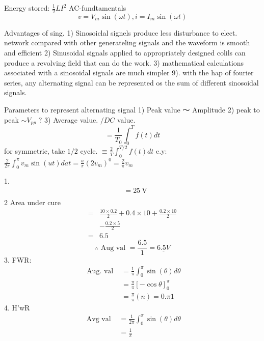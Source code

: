 \documentclass[12pt, a4paper]{article}
\begin{document}
	Energy stored: $\frac{1}{2} L I^2$
	AC-fundtamentals
	$$
		v=V_m \sin (\omega t), i=I_m \sin (\omega t)
	$$

	Advantages of sing.
	1) Sinosoiclal signels produce less disturbance to elect. network compared with other generateling signals and the waveform is smooth and efficient
	2) Sinusoidal signals applied to appropriately designed colils can produce a revolving field that can do the work.
	3) mathematical calculations associated with a sinosoidal signals are much simpler
	9). with the hap of fourier series, any alternating signal can be represented os the sum of different sinosoidal signals.

	Parameters to represent alternating signal
	1) Peak value 〜 Amplitude
	2) peak to peak $\sim V_{p p}$ ?
	3) Average value. $/ D C$ value.
	$$
		=\frac{1}{T_0} \int_0^T f(t) d t
	$$
	for symmetric, take $1 / 2$ cycle. $\equiv \frac{2}{T} \int_0^{T / 2} f(t) d t$
	e.y: $\frac{2}{2 \pi} \int_0^\pi v_m \sin (u t) d a t=\frac{a}{\pi}\left(2 v_m\right)^0=\frac{2}{\pi} v_m$


	1.
	$$
		\begin{aligned}
			 & =25 \mathrm{~V} \\
			 &
		\end{aligned}
	$$
	2 Area under cure
	$$
		\begin{aligned}
			= & \frac{10 \times 0.2}{2}+0.4 \times 10+\frac{0.2 \times 10}{2} \\
			  & -\frac{0.2 \times 5}{2}                                       \\
			= & 6.5
		\end{aligned}
	$$
	$$
		\therefore \text { Aug val }=\frac{6.5}{1}=\underline{6.5 V}
	$$
	3. FWR:
	$$
		\begin{aligned}
			\text { Aug. val } & =\frac{1}{\pi} \int_0^\pi \sin (\theta) d \theta \\
			                   & =\frac{\pi}{\pi}[-\cos \theta]_0^\pi             \\
			                   & =\frac{\pi}{\pi}(n)=0 . \pi 1
		\end{aligned}
	$$
	4. H'wR
	$$
		\begin{aligned}
			\text { Avg val } & =\frac{1}{2 \pi} \int_0^\pi \sin (\theta) d \theta \\
			                  & =\frac{1}{\pi}
		\end{aligned}
	$$
\end{document}
